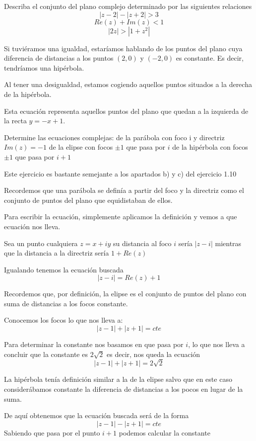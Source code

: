 \begin{problem}[16]
Describa el conjunto del plano complejo determinado por las siguientes relaciones
\ppart
\[|z-2|-|z+2| > 3\]
\ppart
\[Re(z)+Im(z) < 1\]
\ppart
\[|2z|>|1+z^2|\]

\solution
{}

\spart
Si tuviéramos una igualdad, estaríamos hablando de los puntos del plano cuya diferencia de distancias a los puntos $(2,0)$ y $(-2,0)$ es constante. Es decir, tendríamos una hipérbola.

Al tener una desigualdad, estamos cogiendo aquellos puntos situados a la derecha de la hipérbola.

\spart

Esta ecuación representa aquellos puntos del plano que quedan a la izquierda de la recta $y=-x+1$.

\spart



\end{problem}

\begin{problem}[17]
Determine las ecuaciones complejas:
\ppart de la parábola con foco i y directriz $Im(z)=-1$
\ppart de la elipse con focos $\pm 1$ que pasa por $i$
\ppart de la hipérbola con focos $\pm 1$ que pasa por $i+1$

\solution

Este ejercicio es bastante semejante a los apartados b) y c) del ejercicio 1.10

\spart
Recordemos que una parábola se definía a partir del foco y la directriz como el conjunto de puntos del plano que equidistaban de ellos.

Para escribir la ecuación, simplemente aplicamos la definición y vemos a que ecuación nos lleva.

Sea un punto cualquiera $z=x+iy$ su distancia al foco $i$ sería $|z-i|$ mientras que la distancia a la directriz sería $1+Re(z)$

Igualando tenemos la ecuación buscada
\[|z-i|=Re(z)+1\]

\spart
Recordemos que, por definición, la elipse es el conjunto de puntos del plano con suma de distancias a los focos constante.

Conocemos los focos lo que nos lleva a:
\[|z-1|+|z+1|=cte\]

Para determinar la constante nos basamos en que pasa por $i$, lo que nos lleva a concluir que la constante es $2\sqrt{2}$ es decir, nos queda la ecuación
\[|z-1|+|z+1|=2\sqrt{2}\]

\spart
La hipérbola tenía definición similar a la de la elipse salvo que en este caso considerábamos constante la diferencia de distancias a los pocos en lugar de la suma.

De aquí obtenemos que la ecuación buscada será de la forma
\[|z-1|-|z+1|=cte\]
Sabiendo que pasa por el punto $i+1$ podemos calcular la constante

\end{problem}

